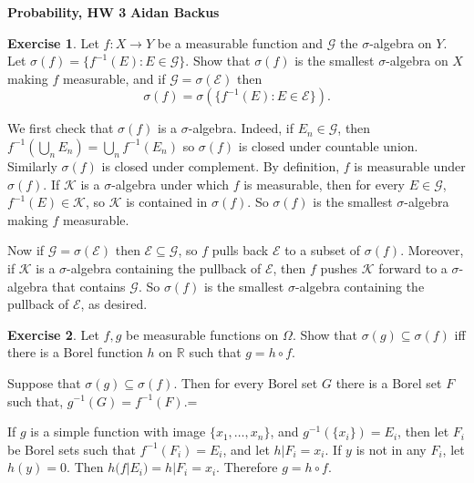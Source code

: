 \documentclass[10pt]{article}
\newcommand{\RR}{\mathbb{R}}
\theoremstyle{definition}
\newtheorem{exer}{Exercise}
\begin{document}
\noindent
\large\textbf{Probability, HW 3} \hfill \textbf{Aidan Backus} \\


\begin{exer}
Let $f: X \to Y$ be a measurable function and $\mathcal G$ the $\sigma$-algebra on $Y$. Let $\sigma(f) = \{f^{-1}(E): E \in \mathcal G\}$.
Show that $\sigma(f)$ is the smallest $\sigma$-algebra on $X$ making $f$ measurable, and if $\mathcal G = \sigma(\mathcal E)$ then
$$\sigma(f) = \sigma(\{f^{-1}(E): E \in \mathcal E\}).$$
\end{exer}

We first check that $\sigma(f)$ is a $\sigma$-algebra.
Indeed, if $E_n \in \mathcal G$, then $f^{-1}(\bigcup_n E_n) = \bigcup_n f^{-1}(E_n)$ so $\sigma(f)$ is closed under countable union. Similarly $\sigma(f)$ is closed under complement.
By definition, $f$ is measurable under $\sigma(f)$.
If $\mathcal K$ is a $\sigma$-algebra under which $f$ is measurable, then for every $E \in \mathcal G$, $f^{-1}(E) \in \mathcal K$, so $\mathcal K$ is contained in $\sigma(f)$.
So $\sigma(f)$ is the smallest $\sigma$-algebra making $f$ measurable.

Now if $\mathcal G = \sigma(\mathcal E)$ then $\mathcal E \subseteq \mathcal G$, so $f$ pulls back $\mathcal E$ to a subset of $\sigma(f)$.
Moreover, if $\mathcal K$ is a $\sigma$-algebra containing the pullback of $\mathcal E$, then $f$ pushes $\mathcal K$ forward to a $\sigma$-algebra that contains $\mathcal G$. So $\sigma(f)$ is the smallest $\sigma$-algebra containing the pullback of $\mathcal E$, as desired.

\begin{exer}
Let $f, g$ be measurable functions on $\Omega$. Show that $\sigma(g) \subseteq \sigma(f)$ iff there is a Borel function $h$ on $\RR$ such that $g = h \circ f$.
\end{exer}

Suppose that $\sigma(g) \subseteq \sigma(f)$. Then for every Borel set $G$ there is a Borel set $F$ such that, $g^{-1}(G) = f^{-1}(F)$.=

If $g$ is a simple function with image $\{x_1, \dots, x_n\}$, and $g^{-1}(\{x_i\}) = E_i$, then let $F_i$ be Borel sets such that $f^{-1}(F_i) = E_i$, and let $h|F_i = x_i$.
If $y$ is not in any $F_i$, let $h(y) = 0$.
Then $h(f|E_i) = h|F_i = x_i$. Therefore $g = h \circ f$.
\end{document}
